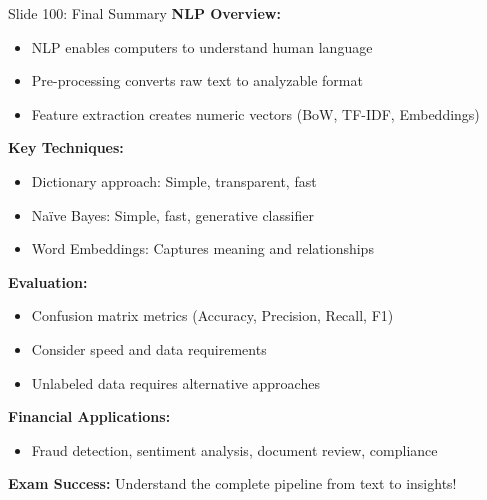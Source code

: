\documentclass[8pt]{beamer}
\begin{document}
	\begin{frame}{Slide 100: Final Summary}
		\fontsize{6.5}{7.5}\selectfont
		\textbf{\textcolor{myblue}{NLP Overview:}}
		\begin{itemize}
			\item NLP enables computers to understand human language
			\item Pre-processing converts raw text to analyzable format
			\item Feature extraction creates numeric vectors (BoW, TF-IDF, Embeddings)
		\end{itemize}
		
		\vspace{0.1cm}
		\textbf{\textcolor{myblue}{Key Techniques:}}
		\begin{itemize}
			\item Dictionary approach: Simple, transparent, fast
			\item Naïve Bayes: Simple, fast, generative classifier
			\item Word Embeddings: Captures meaning and relationships
		\end{itemize}
		
		\vspace{0.1cm}
		\textbf{\textcolor{myblue}{Evaluation:}}
		\begin{itemize}
			\item Confusion matrix metrics (Accuracy, Precision, Recall, F1)
			\item Consider speed and data requirements
			\item Unlabeled data requires alternative approaches
		\end{itemize}
		
		\vspace{0.1cm}
		\textbf{\textcolor{myblue}{Financial Applications:}}
		\begin{itemize}
			\item Fraud detection, sentiment analysis, document review, compliance
		\end{itemize}
		
		\textcolor{myred}{\textbf{Exam Success:}} Understand the complete pipeline from text to insights!
	\end{frame}
	
\end{document}
